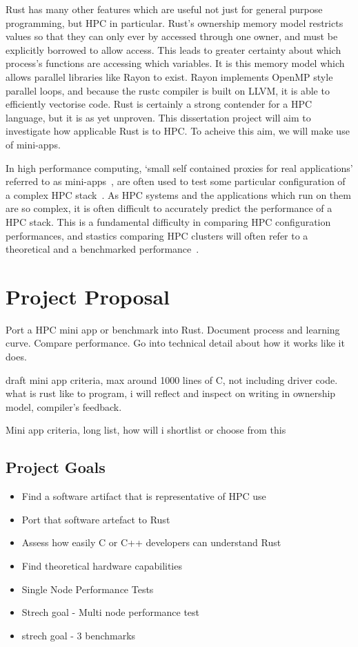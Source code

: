 \documentclass{report}[a4]
\begin{document}
Rust has many other features which are useful not just for general purpose programming, but HPC in particular. Rust's ownership memory model restricts values so that they can only ever by accessed through one owner, and must be explicitly borrowed to allow access. This leads to greater certainty about which process's functions are accessing which variables.
It is this memory model which allows parallel libraries like Rayon to exist. Rayon implements OpenMP style parallel loops, and because the rustc compiler is built on LLVM, it is able to efficiently vectorise code. Rust is certainly a strong contender for a HPC language, but it is as yet unproven. This dissertation project will aim to investigate how applicable Rust is to HPC. To acheive this aim, we will make use of mini-apps.

In high performance computing, `small self contained proxies for real applications' referred to as mini-apps~\cite{heroux2009improving}, are often used to test some particular configuration of a complex HPC stack~\cite{Mallinson:2014, Slaughter:2015}. As HPC systems and the applications which run on them are so complex, it is often difficult to accurately predict the performance of a HPC stack. This is a fundamental difficulty in comparing HPC configuration performances, and stastics comparing HPC clusters will often refer to a theoretical and a benchmarked performance~\cite{top500}.

\chapter{Project Proposal} %
Port a HPC mini app or benchmark into Rust. Document process and learning curve. Compare performance. Go into technical detail about how it works like it does.

draft mini app criteria, max around 1000 lines of C, not including driver code. what is rust like to program, i will reflect and inspect on writing in ownership model, compiler's feedback.

Mini app criteria, long list, how will i shortlist or choose from this
\section{Project Goals}
\begin{itemize}
  \item Find a software artifact that is representative of HPC use
  \item Port that software artefact to Rust
  \item Assess how easily C or C++ developers can understand Rust
  \item Find theoretical hardware capabilities
  \item Single Node Performance Tests
  \item Strech goal - Multi node performance test
  \item strech goal - 3 benchmarks
\end{itemize}
\end{document}
